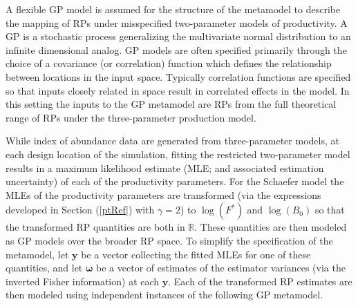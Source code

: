%
A flexible GP model is assumed for the structure of the metamodel to describe 
the mapping of RPs under misspecified two-parameter models of productivity. A 
GP is a stochastic process generalizing the multivariate normal distribution to 
an infinite dimensional analog. GP models are often specified primarily
through the choice of a covariance (or correlation) function which defines the
relationship between locations in the input space. %
Typically correlation functions are specified so that inputs closely related in
space result in correlated effects in the model. In this setting the inputs to
the GP metamodel are RPs from the full theoretical range of RPs under the 
three-parameter production model. 

%
While index of abundance data are generated from three-parameter models, at each
design location of the simulation, fitting the restricted two-parameter model
results in a maximum likelihood estimate (MLE; and associated estimation
uncertainty) of each of the productivity parameters. For the Schaefer model 
the MLEs of the productivity parameters are transformed (via the expressions 
developed in Section (\ref{ptRef}) with $\gamma=2$) to $\log(F^*)$ and $\log(B_0)$
so that the transformed RP quantities are both in $\mathbb{R}$. 
%
These quantities are then modeled as GP models over the broader RP space.
To simplify the specification of the metamodel, let $\textbf{y}$ be a vector
collecting the fitted MLEs for one of these quantities, and let
$\bm{\omega}$ be a vector of estimates of the estimator variances (via the
inverted Fisher information) at each $\textbf{y}$.
%
Each of the transformed RP estimates are then modeled using
independent instances of the following GP metamodel. %

